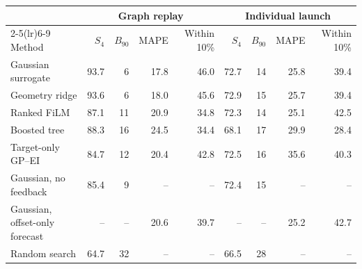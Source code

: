 \begin{tabular}{lrrrrrrrr}
\toprule
 & \multicolumn{4}{c}{Graph replay} & \multicolumn{4}{c}{Individual launch} \\
\cmidrule(lr){2-5}\cmidrule(lr){6-9}
Method & $S_4$ & $B_{90}$ & MAPE & Within 10\% & $S_4$ & $B_{90}$ & MAPE & Within 10\% \\
\midrule
Gaussian surrogate & 93.7 & 6 & 17.8 & 46.0 & 72.7 & 14 & 25.8 & 39.4 \\
Geometry ridge & 93.6 & 6 & 18.0 & 45.6 & 72.9 & 15 & 25.7 & 39.4 \\
Ranked FiLM & 87.1 & 11 & 20.9 & 34.8 & 72.3 & 14 & 25.1 & 42.5 \\
Boosted tree & 88.3 & 16 & 24.5 & 34.4 & 68.1 & 17 & 29.9 & 28.4 \\
Target-only GP--EI & 84.7 & 12 & 20.4 & 42.8 & 72.5 & 16 & 35.6 & 40.3 \\
Gaussian, no feedback & 85.4 & 9 & -- & -- & 72.4 & 15 & -- & -- \\
Gaussian, offset-only forecast & -- & -- & 20.6 & 39.7 & -- & -- & 25.2 & 42.7 \\
Random search & 64.7 & 32 & -- & -- & 66.5 & 28 & -- & -- \\
\bottomrule
\end{tabular}
